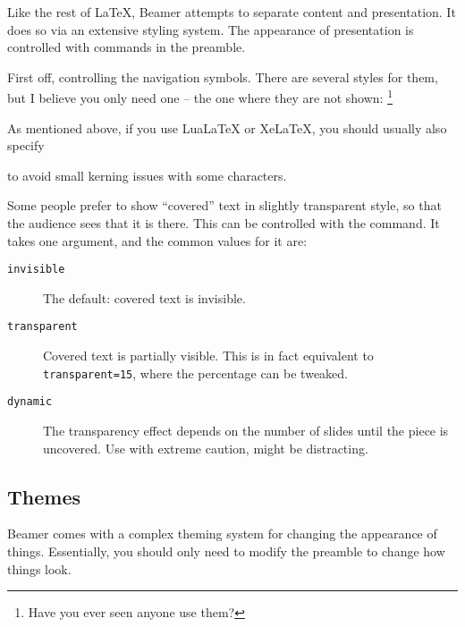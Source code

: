 Like the rest of \LaTeX, Beamer attempts to separate content and presentation.
It does so via an extensive styling system.
The appearance of presentation is controlled with commands in the preamble.

First off, controlling the navigation symbols.
There are several styles for them, but I believe you only need one
-- the one where they are not shown:%
\footnote{Have you ever seen anyone use them?}
\begin{ExampleCode}
\beamertemplatenavigationsymbolsempty
\end{ExampleCode}

\begin{remark}
As mentioned above, if you use LuaLaTeX or XeLaTeX,
you should usually also specify
\begin{ExampleCode}
\end{ExampleCode}
to avoid small kerning issues with some characters.
\end{remark}


Some people prefer to show ``covered'' text in slightly transparent style,
so that the audience sees that it is there.
This can be controlled with the  command.
It takes one argument, and the common values for it are:
\begin{description}
\item[\texttt{invisible}] The default: covered text is invisible.
\item[\texttt{transparent}] Covered text is partially visible.
    This is in fact equivalent to \verb|transparent=15|, where the percentage can be tweaked.
\item[\texttt{dynamic}] The transparency effect depends on the number of slides until the piece is uncovered.
    Use with extreme caution, might be distracting.
\end{description}



%
%
\subsection{Themes}

Beamer comes with a complex theming system for changing the appearance of things.
Essentially, you should only need to modify the preamble to change how things look.

